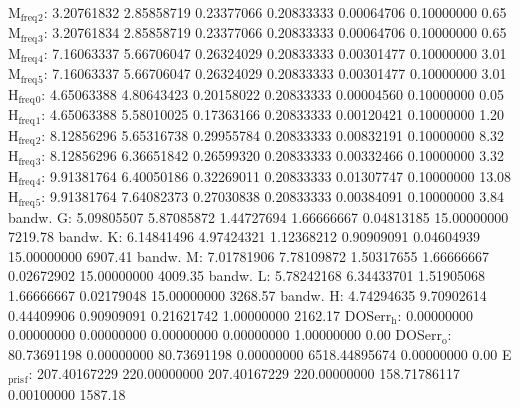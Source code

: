 \documentclass[11pt]{article}
\begin{document}
M\(_{\text{freq}}\)\(_{\text{2}}\):   3.20761832   2.85858719   0.23377066   0.20833333   0.00064706   0.10000000         0.65
M\(_{\text{freq}}\)\(_{\text{3}}\):   3.20761834   2.85858719   0.23377066   0.20833333   0.00064706   0.10000000         0.65
M\(_{\text{freq}}\)\(_{\text{4}}\):   7.16063337   5.66706047   0.26324029   0.20833333   0.00301477   0.10000000         3.01
M\(_{\text{freq}}\)\(_{\text{5}}\):   7.16063337   5.66706047   0.26324029   0.20833333   0.00301477   0.10000000         3.01
H\(_{\text{freq}}\)\(_{\text{0}}\):   4.65063388   4.80643423   0.20158022   0.20833333   0.00004560   0.10000000         0.05
H\(_{\text{freq}}\)\(_{\text{1}}\):   4.65063388   5.58010025   0.17363166   0.20833333   0.00120421   0.10000000         1.20
H\(_{\text{freq}}\)\(_{\text{2}}\):   8.12856296   5.65316738   0.29955784   0.20833333   0.00832191   0.10000000         8.32
H\(_{\text{freq}}\)\(_{\text{3}}\):   8.12856296   6.36651842   0.26599320   0.20833333   0.00332466   0.10000000         3.32
H\(_{\text{freq}}\)\(_{\text{4}}\):   9.91381764   6.40050186   0.32269011   0.20833333   0.01307747   0.10000000        13.08
H\(_{\text{freq}}\)\(_{\text{5}}\):   9.91381764   7.64082373   0.27030838   0.20833333   0.00384091   0.10000000         3.84
bandw. G:   5.09805507   5.87085872   1.44727694   1.66666667   0.04813185  15.00000000      7219.78
bandw. K:   6.14841496   4.97424321   1.12368212   0.90909091   0.04604939  15.00000000      6907.41
bandw. M:   7.01781906   7.78109872   1.50317655   1.66666667   0.02672902  15.00000000      4009.35
bandw. L:   5.78242168   6.34433701   1.51905068   1.66666667   0.02179048  15.00000000      3268.57
bandw. H:   4.74294635   9.70902614   0.44409906   0.90909091   0.21621742   1.00000000      2162.17
DOSerr\(_{\text{h}}\):   0.00000000   0.00000000   0.00000000   0.00000000   0.00000000   1.00000000         0.00
DOSerr\(_{\text{o}}\):  80.73691198   0.00000000  80.73691198   0.00000000 6518.44895674   0.00000000         0.00
E\(_{\text{pris}}\)\(_{\text{f}}\): 207.40167229 220.00000000 207.40167229 220.00000000 158.71786117   0.00100000      1587.18
\end{document}
